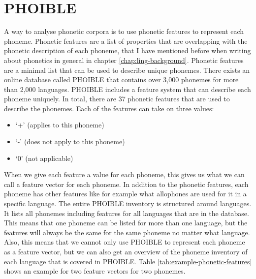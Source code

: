 \section{PHOIBLE}
\label{sec:phoible}
A way to analyse phonetic corpora is to use phonetic features to represent each phoneme. Phonetic features are a list of properties that are overlapping with the phonetic description of each phoneme, that I have mentioned before when writing about phonetics in general in chapter \ref{chap:ling-background}. Phonetic features are a minimal list that can be used to describe unique phonemes. There exists an online database called PHOIBLE \citep{phoible} that contains over 3,000 phonemes for more than 2,000 languages. PHOIBLE includes a feature system that can describe each phoneme uniquely. In total, there are 37 phonetic features that are used to describe the phonemes. Each of the features can take on three values:
\begin{itemize}
    \item `+' (applies to this phoneme)
    \item `-' (does not apply to this phoneme)
    \item `0' (not applicable)
\end{itemize}
When we give each feature a value for each phoneme, this gives us what we can call a feature vector for each phoneme. In addition to the phonetic features, each phoneme has other features like for example what allophones are used for it in a specific language. The entire PHOIBLE inventory is structured around languages. It lists all phonemes including features for all languages that are in the database. This means that one phoneme can be listed for more than one language, but the features will always be the same for the same phoneme no matter what language. Also, this means that we cannot only use PHOIBLE to represent each phoneme as a feature vector, but we can also get an overview of the phoneme inventory of each language that is covered in PHOIBLE. Table \ref{tab:example-phonetic-features} shows an example for two feature vectors for two phonemes.

